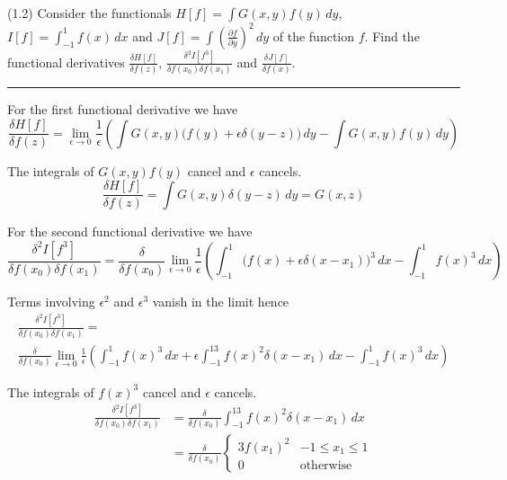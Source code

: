 \documentclass[12pt]{article}
\begin{document}
(1.2)
Consider the functionals
$H[f]=\int G(x,y)f(y)\,dy$,
$I[f]=\int_{-1}^1f(x)\,dx$
and
$J[f]=\int\left(\frac{\partial f}{\partial y}\right)^2\,dy$
of the function $f$.
Find the functional derivatives
$\frac{\delta H[f]}{\delta f(z)}$,
$\frac{\delta^2I[f^3]}{\delta f(x_0)\delta f(x_1)}$
and
$\frac{\delta J[f]}{\delta f(x)}$.

\bigskip
\hrule

\bigskip
For the first functional derivative we have
\begin{equation*}
\frac{\delta H[f]}{\delta f(z)}
=\lim_{\epsilon\rightarrow0}\frac{1}{\epsilon}
\left(
\int G(x,y)\big(f(y)+\epsilon\delta(y-z)\big)\,dy
-\int G(x,y)f(y)\,dy
\right)
\end{equation*}

The integrals of $G(x,y)f(y)$ cancel and $\epsilon$ cancels.
\begin{equation*}
\frac{\delta H[f]}{\delta f(z)}=\int G(x,y)\delta(y-z)\,dy=G(x,z)
\end{equation*}

For the second functional derivative we have
\begin{equation*}
\frac{\delta^2 I[f^3]}{\delta f(x_0)\delta f(x_1)}
=\frac{\delta}{\delta f(x_0)}
\lim_{\epsilon\rightarrow0}\frac{1}{\epsilon}
\left(
\int_{-1}^{1}\big(f(x)+\epsilon\delta(x-x_1)\big)^3\,dx
-\int_{-1}^{1}f(x)^3\,dx
\right)
\end{equation*}

Terms involving $\epsilon^2$ and $\epsilon^3$ vanish in the limit hence
\begin{multline*}
\frac{\delta^2 I[f^3]}{\delta f(x_0)\delta f(x_1)}={}
\\
\frac{\delta}{\delta f(x_0)}
\lim_{\epsilon\rightarrow0}\frac{1}{\epsilon}
\left(
\int_{-1}^1f(x)^3\,dx+\epsilon\int_{-1}^13f(x)^2\delta(x-x_1)\,dx-\int_{-1}^{1}f(x)^3\,dx
\right)
\end{multline*}

The integrals of $f(x)^3$ cancel and $\epsilon$ cancels.
\begin{align*}
\frac{\delta^2 I[f^3]}{\delta f(x_0)\delta f(x_1)}
&=\frac{\delta}{\delta f(x_0)}\int_{-1}^13f(x)^2\delta(x-x_1)\,dx
\\
&=\frac{\delta}{\delta f(x_0)}
\begin{cases}
3f(x_1)^2 & -1\le x_1\le 1
\\
0 & \text{otherwise}
\end{cases}
\tag{1}
\end{align*}
\end{document}
